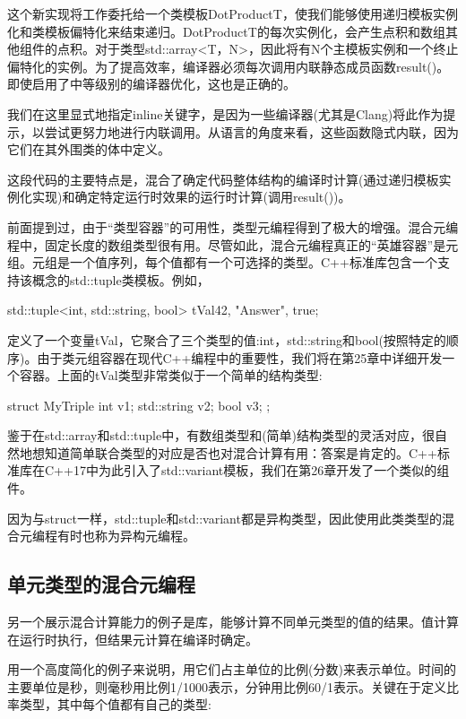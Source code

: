这个新实现将工作委托给一个类模板DotProductT，使我们能够使用递归模板实例化和类模板偏特化来结束递归。DotProductT的每次实例化，会产生点积和数组其他组件的点积。对于类型std::array<T，N>，因此将有N个主模板实例和一个终止偏特化的实例。为了提高效率，编译器必须每次调用内联静态成员函数result()。即使启用了中等级别的编译器优化，这也是正确的。

\begin{notice}
我们在这里显式地指定inline关键字，是因为一些编译器(尤其是Clang)将此作为提示，以尝试更努力地进行内联调用。从语言的角度来看，这些函数隐式内联，因为它们在其外围类的体中定义。
\end{notice}

这段代码的主要特点是，混合了确定代码整体结构的编译时计算(通过递归模板实例化实现)和确定特定运行时效果的运行时计算(调用result())。

前面提到过，由于“类型容器”的可用性，类型元编程得到了极大的增强。混合元编程中，固定长度的数组类型很有用。尽管如此，混合元编程真正的“英雄容器”是元组。元组是一个值序列，每个值都有一个可选择的类型。C++标准库包含一个支持该概念的std::tuple类模板。例如，

\begin{cpp}
std::tuple<int, std::string, bool> tVal{42, "Answer", true};
\end{cpp}

定义了一个变量tVal，它聚合了三个类型的值:int，std::string和bool(按照特定的顺序)。由于类元组容器在现代C++编程中的重要性，我们将在第25章中详细开发一个容器。上面的tVal类型非常类似于一个简单的结构类型:

\begin{cpp}
struct MyTriple {
	int v1;
	std::string v2;
	bool v3;
};
\end{cpp}

鉴于在std::array和std::tuple中，有数组类型和(简单)结构类型的灵活对应，很自然地想知道简单联合类型的对应是否也对混合计算有用：答案是肯定的。C++标准库在C++17中为此引入了std::variant模板，我们在第26章开发了一个类似的组件。

因为与struct一样，std::tuple和std::variant都是异构类型，因此使用此类类型的混合元编程有时也称为异构元编程。

\subsection{单元类型的混合元编程}

另一个展示混合计算能力的例子是库，能够计算不同单元类型的值的结果。值计算在运行时执行，但结果元计算在编译时确定。

用一个高度简化的例子来说明，用它们占主单位的比例(分数)来表示单位。时间的主要单位是秒，则毫秒用比例1/1000表示，分钟用比例60/1表示。关键在于定义比率类型，其中每个值都有自己的类型:

